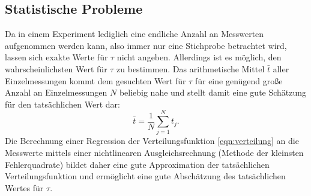 \subsection{Statistische Probleme}
Da in einem Experiment lediglich eine endliche Anzahl an Messwerten aufgenommen werden kann, also immer nur eine Stichprobe betrachtet wird, lassen sich exakte Werte für $\tau$ nicht angeben.
Allerdings ist es möglich, den wahrscheinlichsten Wert für $\tau$ zu bestimmen.
Das arithmetische Mittel $\bar{t}$ aller Einzelmessungen kommt dem gesuchten Wert für $\tau$
für eine genügend große Anzahl an Einzelmessungen $N$
beliebig nahe und stellt damit eine gute Schätzung für den tatsächlichen Wert dar:
\begin{equation}
  \bar{t}=\frac{1}{N}\sum_{j=1}^{N} t_j \mathrm{.}
\end{equation}
Die Berechnung einer Regression der Verteilungsfunktion \eqref{eqn:verteilung} an die Messwerte mittels einer nichtlinearen Ausgleichsrechnung (Methode der kleinsten Fehlerquadrate) bildet daher eine gute Approximation der tatsächlichen Verteilungsfunktion und ermöglicht eine gute Abschätzung des tatsächlichen Wertes für $\tau$.

